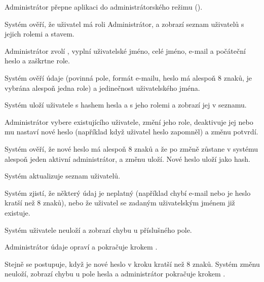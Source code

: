 \begin{ucsteps}
  \item \label{uc:16:1}Administrátor přepne aplikaci do administrátorského režimu ().
  \item \label{uc:16:2}Systém ověří, že uživatel má roli Administrátor, a zobrazí seznam uživatelů s jejich rolemi a stavem. 
  \item \label{uc:16:3}Administrátor zvolí , vyplní uživatelské jméno, celé jméno, e-mail a počáteční heslo a zaškrtne role.
  \item \label{uc:16:4}Systém ověří údaje (povinná pole, formát e-mailu, heslo má alespoň 8 znaků, je vybrána alespoň jedna role) a jedinečnost uživatelského jména. 
  \item \label{uc:16:5}Systém uloží uživatele s hashem hesla a s jeho rolemi a zobrazí jej v seznamu.
  \item \label{uc:16:6}Administrátor vybere existujícího uživatele, změní jeho role, deaktivuje jej nebo mu nastaví nové heslo (například když uživatel heslo zapomněl) a změnu potvrdí.
  \item \label{uc:16:7}Systém ověří, že nové heslo má alespoň 8 znaků a že po změně zůstane v systému alespoň jeden aktivní administrátor, a změnu uloží. Nové heslo uloží jako hash. 
  \item \label{uc:16:8}Systém aktualizuje seznam uživatelů.
\end{ucsteps}

\begin{ucalt}
  \item[4.1]\label{uc:16:4.1} Systém zjistí, že některý údaj je neplatný (například chybí e-mail nebo je heslo kratší než 8 znaků), nebo že uživatel se zadaným uživatelským jménem již existuje.
  \item[4.2]\label{uc:16:4.2} Systém uživatele neuloží a zobrazí chybu u příslušného pole.
  \item[4.3]\label{uc:16:4.3} Administrátor údaje opraví a pokračuje krokem .
\end{ucalt}
Stejně se postupuje, když je nové heslo v kroku  kratší než 8 znaků. Systém změnu neuloží, zobrazí chybu u pole hesla a administrátor pokračuje krokem .


